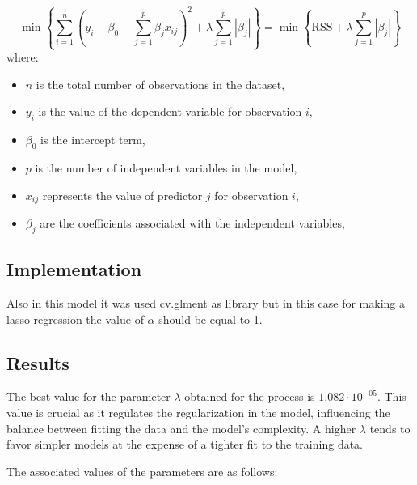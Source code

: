 \documentclass[10pt]{article} %
\begin{document}
    \begin{equation}
    \min \left\{ \sum_{i=1}^n \left( y_i - \beta_0 - \sum_{j=1}^p \beta_j x_{ij} \right)^2 + \lambda \sum_{j=1}^p \left| \beta_j \right| \right\} = \min \left\{ \text{RSS} + \lambda \sum_{j=1}^p \left| \beta_j \right| \right\}
         \label{eq:lasso} 
    \end{equation}
    where:
    \begin{itemize}
        \item $n$ is the total number of observations in the dataset,
        \item $y_i$ is the value of the dependent variable for observation $i$,
        \item $\beta_0$ is the intercept term,
        \item $p$ is the number of independent variables in the model,
        \item $x_{ij}$ represents the value of predictor $j$ for observation $i$,
        \item $\beta_j$ are the coefficients associated with the independent variables,
    \end{itemize}
    \subsection{Implementation}

    Also in this model it was used cv.glment as library but in this case for making a lasso regression the value of $\alpha$ should be equal to 1.

    \subsection{Results}
    The best value for the parameter $\lambda$ obtained for the process is $1.082 \cdot 10^{-05}$. This value is crucial as it regulates the regularization in the model, influencing the balance between fitting the data and the model's complexity. A higher $\lambda$ tends to favor simpler models at the expense of a tighter fit to the training data.
    
    The associated values of the parameters are as follows:
    
\end{document}
